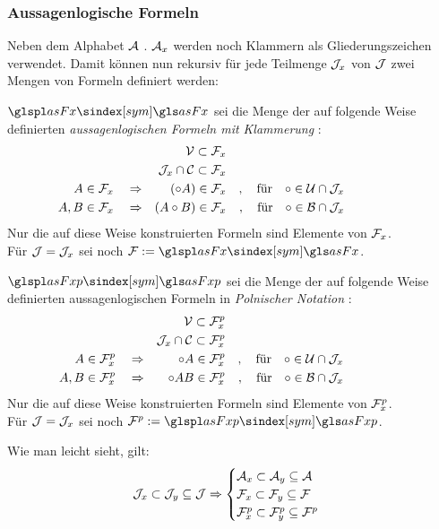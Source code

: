 \subsubsection{Aussagenlogische Formeln}%
\label{subsub:Formeln}

Neben dem Alphabet $\mathcal{A}$ \textbzw. $\mathcal{A}_x$ werden noch Klammern als Gliederungszeichen verwendet.
Damit können nun rekursiv für jede Teilmenge $\mathcal{J}_x$ von $\mathcal{J}$ zwei Mengen von Formeln definiert werden:

$\glsSym{asFx}$ sei die Menge der auf folgende Weise definierten \emph{aussagenlogischen Formeln mit Klammerung}%
:
\begin{align}
	&                & \mathcal{V}            \subset \mathcal{F}_x
	\\
	&                & \mathcal{J}_x \cap \mathcal{C} \subset \mathcal{F}_x
	\\
	A                                \in \mathcal{F}_x
	& \quad \Rightarrow &  (\circ A)    \in \mathcal{F}_x
	& & , \quad \text{für} \quad \circ \in \mathcal{U} \cap \mathcal{J}_x
	\\
	A, B                             \in \mathcal{F}_x
	& \quad \Rightarrow & (A \circ B)   \in \mathcal{F}_x
	& & , \quad \text{für} \quad \circ \in \mathcal{B} \cap \mathcal{J}_x
	&&&&&&&&&&
\end{align}
Nur die auf diese Weise konstruierten Formeln sind Elemente von $\mathcal{F}_x$.
\\Für $\mathcal{J} = \mathcal{J}_x$ sei noch $\asF \defeq \glsSym{asFx}$.

$\glsSym{asFxp}$ sei die Menge der auf folgende Weise definierten aussagenlogischen Formeln in \emph{Polnischer Notation}%
:
\begin{align}
	&                & \mathcal{V}            \subset \mathcal{F}_x^p
	\\
	&                & \mathcal{J}_x \cap \mathcal{C} \subset \mathcal{F}_x^p
	\\
	A                            \in \mathcal{F}_x^p
	& \quad \Rightarrow & \circ A   \in \mathcal{F}_x^p
	& & , \quad \text{für} \quad \circ \in \mathcal{U} \cap \mathcal{J}_x
	\\
	A, B                         \in \mathcal{F}_x^p
	& \quad \Rightarrow & \circ A B \in \mathcal{F}_x^p
	& & , \quad \text{für} \quad \circ \in \mathcal{B} \cap \mathcal{J}_x
	&&&&&&&&&&
\end{align}
Nur die auf diese Weise konstruierten Formeln sind Elemente von $\mathcal{F}_x^p$.
\\Für $\mathcal{J} = \mathcal{J}_x$ sei noch $\asFp \defeq \glsSym{asFxp}$.

Wie man leicht sieht, gilt:
\begin{equation}
	\mathcal{J}_x \subset \mathcal{J}_y \subseteq \mathcal{J} \Rightarrow
	\begin{cases}
		\mathcal{A}_x  \subset \mathcal{A}_y  \subseteq \mathcal{A} \\
		\mathcal{F}_x  \subset \mathcal{F}_y  \subseteq \mathcal{F} \\
		\mathcal{F}_x^p \subset \mathcal{F}_y^p \subseteq \mathcal{F}^p
	\end{cases}
\end{equation}

